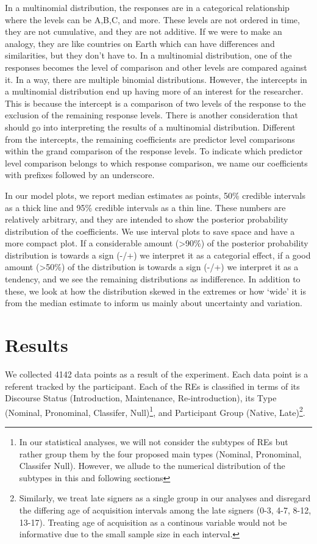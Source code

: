 \documentclass[]{elsarticle} %
\begin{document}
In a multinomial distribution, the responses are in a categorical
relationship where the levels can be A,B,C, and more. These levels are
not ordered in time, they are not cumulative, and they are not additive.
If we were to make an analogy, they are like countries on Earth which
can have differences and similarities, but they don't have to. In a
multinomial distribution, one of the responses becomes the level of
comparison and other levels are compared against it. In a way, there are
multiple binomial distributions. However, the intercepts in a
multinomial distribution end up having more of an interest for the
researcher. This is because the intercept is a comparison of two levels
of the response to the exclusion of the remaining response levels. There
is another consideration that should go into interpreting the results of
a multinomial distribution. Different from the intercepts, the remaining
coefficients are predictor level comparisons within the grand comparison
of the response levels. To indicate which predictor level comparison
belongs to which response comparison, we name our coefficients with
prefixes followed by an underscore.

In our model plots, we report median estimates as points, 50\% credible
intervals as a thick line and 95\% credible intervals as a thin line.
These numbers are relatively arbitrary, and they are intended to show
the posterior probability distribution of the coefficients. We use
interval plots to save space and have a more compact plot. If a
considerable amount (\textgreater90\%) of the posterior probability
distribution is towards a sign (-/+) we interpret it as a categorial
effect, if a good amount (\textgreater50\%) of the distribution is
towards a sign (-/+) we interpret it as a tendency, and we see the
remaining distributions as indifference. In addition to these, we look
at how the distribution skewed in the extremes or how `wide' it is from
the median estimate to inform us mainly about uncertainty and variation.

\hypertarget{results}{%
\section{Results}\label{results}}

We collected 4142 data points as a result of the experiment. Each data
point is a referent tracked by the participant. Each of the REs is
classified in terms of its Discourse Status (Introduction, Maintenance,
Re-introduction), its Type (Nominal, Pronominal, Classifer,
Null)\footnote{In our statistical analyses, we will not consider the subtypes of REs but rather group them by the four proposed main types (Nominal, Pronominal, Classifer Null). However, we allude to the numerical distribution of the subtypes in this and following sections},
and Participant Group (Native,
Late)\footnote{Similarly, we treat late signers as a single group in our analyses and disregard the differing age of acquisition intervals among the late signers (0-3, 4-7, 8-12, 13-17). Treating age of acquisition as a continous variable would not be informative due to the small sample size in each interval.}.
\end{document}
